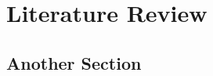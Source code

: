\chapter{Literature Review}
\label{chap:lr}


\Blindtext[2]

\section{Another Section}
\Blindtext[1]

